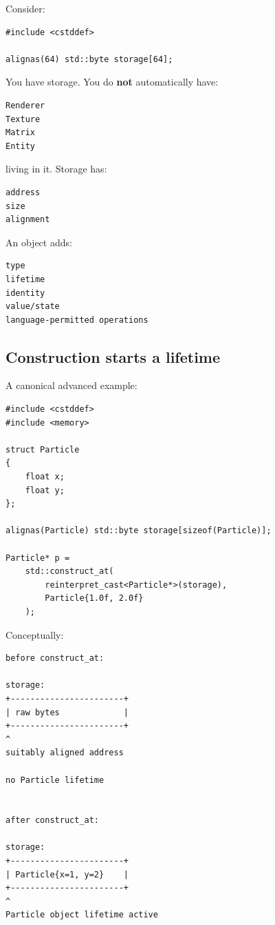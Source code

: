 Consider:

\begin{verbatim}
#include <cstddef>

alignas(64) std::byte storage[64];
\end{verbatim}

You have storage. You do \textbf{not} automatically have:

\begin{verbatim}
Renderer
Texture
Matrix
Entity
\end{verbatim}

living in it. Storage has:

\begin{verbatim}
address
size
alignment
\end{verbatim}

An object adds:

\begin{verbatim}
type
lifetime
identity
value/state
language-permitted operations
\end{verbatim}

\subsection{Construction starts a lifetime}\label{01-foundations-i-ch002-construction-starts-a-lifetime}

A canonical advanced example:

\begin{verbatim}
#include <cstddef>
#include <memory>

struct Particle
{
    float x;
    float y;
};

alignas(Particle) std::byte storage[sizeof(Particle)];

Particle* p =
    std::construct_at(
        reinterpret_cast<Particle*>(storage),
        Particle{1.0f, 2.0f}
    );
\end{verbatim}

Conceptually:

\begin{verbatim}
before construct_at:

storage:
+-----------------------+
| raw bytes             |
+-----------------------+
^
suitably aligned address

no Particle lifetime


after construct_at:

storage:
+-----------------------+
| Particle{x=1, y=2}    |
+-----------------------+
^
Particle object lifetime active
\end{verbatim}

